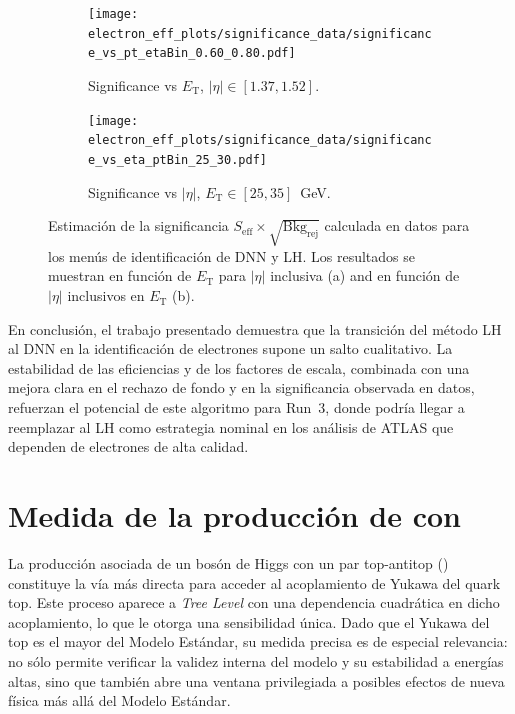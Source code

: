 \begin{figure}[h]
  \centering

  \begin{subfigure}{0.48\textwidth}
    \centering
    \texttt{[image: electron\_eff\_plots/significance\_data/significance\_vs\_pt\_etaBin\_0.60\_0.80.pdf]}
    \caption{\small{Significance vs $E_{\mathrm{T}}$, $|\eta|\in[1.37,1.52]$.}}
    \label{fig:significance_vs_pt_etaBin}
  \end{subfigure}\hfill
  \begin{subfigure}{0.48\textwidth}
    \centering
    \texttt{[image: electron\_eff\_plots/significance\_data/significance\_vs\_eta\_ptBin\_25\_30.pdf]}
    \caption{\small{Significance vs $|\eta|$, $E_{\mathrm{T}}\in[25,35]$~GeV.}}
    \label{fig:significance_vs_eta_ptBin}
  \end{subfigure}

  \caption{Estimación de la significancia $S_{\mathrm{eff}} \times \sqrt{\mathrm{Bkg}_{\mathrm{rej}}}$ 
  calculada en datos para los menús de identificación de DNN y LH. 
  Los resultados se muestran en función de $E_{\mathrm{T}}$ para $|\eta|$ inclusiva (a) and en función de $|\eta|$ inclusivos en $E_{\mathrm{T}}$ (b).}
  \label{fig:significance_bins}
\end{figure}


En conclusión, el trabajo presentado demuestra que la transición del método LH al DNN en la identificación de electrones supone un salto cualitativo. La estabilidad de las eficiencias y de los factores de escala, combinada con una mejora clara en el rechazo de fondo y en la significancia observada en datos, refuerzan el potencial de este algoritmo para Run~3, donde podría llegar a reemplazar al LH como estrategia nominal en los análisis de ATLAS que dependen de electrones de alta calidad. 

\FloatBarrier

\section*{Medida de la producción de \ttH con \htautau}

La producción asociada de un bosón de Higgs con un par top-antitop (\ttH) constituye la vía más directa para acceder al acoplamiento de Yukawa del quark top. Este proceso aparece a \textit{Tree Level} con una dependencia cuadrática en dicho acoplamiento, lo que le otorga una sensibilidad única. Dado que el Yukawa del top es el mayor del Modelo Estándar, su medida precisa es de especial relevancia: no sólo permite verificar la validez interna del modelo y su estabilidad a energías altas, sino que también abre una ventana privilegiada a posibles efectos de nueva física más allá del Modelo Estándar.  

